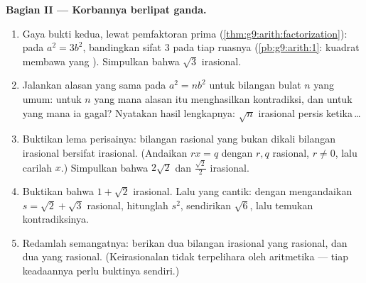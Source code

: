 \begin{problem}
\medskip
\noindent\textbf{Bagian II --- Korbannya berlipat ganda.}
\begin{enumerate}[resume]
  \item Gaya bukti kedua, lewat pemfaktoran prima
        (\cref{thm:g9:arith:factorization}): pada $a^2 = 3b^2$,
        bandingkan sifat  \emph{ $3$} pada tiap
        ruasnya (\cref{pb:g9:arith:1}: kuadrat membawa  yang
        ). Simpulkan bahwa $\sqrt3$ irasional.
  \item Jalankan alasan  yang sama pada $a^2 = n b^2$ untuk
        bilangan bulat $n$ yang umum: untuk $n$ yang mana alasan itu
        menghasilkan kontradiksi, dan untuk yang mana ia gagal?
        Nyatakan hasil lengkapnya: $\sqrt n$ irasional persis
        ketika\,\dots
  \item Buktikan lema perisainya: bilangan rasional yang bukan 
        dikali bilangan irasional bersifat irasional. (Andaikan
        $r x = q$ dengan $r, q$ rasional, $r \neq 0$, lalu carilah
        $x$.) Simpulkan bahwa
        $2\sqrt2$ dan $\frac{\sqrt2}{2}$ irasional.
  \item Buktikan bahwa $1 + \sqrt2$ irasional. Lalu yang cantik:
        dengan mengandaikan $s = \sqrt2 + \sqrt3$ rasional,
        hitunglah $s^2$, sendirikan $\sqrt6$, lalu temukan
        kontradiksinya.
  \item Redamlah semangatnya: berikan dua bilangan irasional yang
        \emph{} rasional, dan dua yang \emph{} rasional. (Keirasionalan tidak terpelihara oleh
        aritmetika --- tiap keadaannya perlu buktinya sendiri.)
\end{enumerate}


\end{problem}
